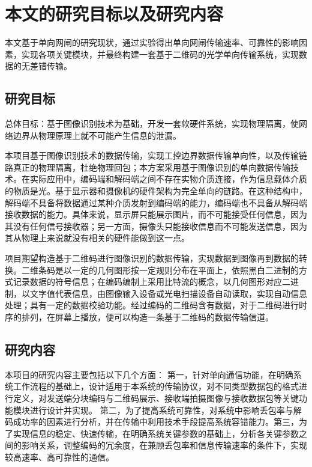 \section{本文的研究目标以及研究内容}

本文基于单向网闸的研究现状，通过实验得出单向网闸传输速率、可靠性的影响因素，实现各项关键模块，并最终构建一套基于二维码的光学单向传输系统，实现数据的无差错传输。

\subsection{研究目标}

总体目标：基于图像识别技术为基础，开发一套软硬件系统，实现物理隔离，使网络边界从物理原理上就不可能产生信息的泄漏。

本项目基于图像识别技术的数据传输，实现工控边界数据传输单向性，以及传输链路真正的物理隔离，杜绝物理回包；本方案采用基于图像识别的单向数据传输技术。在实际应用中，编码端和解码端之间不存在实物介质连接，作为信息载体介质的物质是光。基于显示器和摄像机的硬件架构为完全单向的链路。在这种结构中，解码端不具备将数据通过某种介质发射到编码端的能力，编码端也不具备从解码端接收数据的能力。具体来说，显示屏只能展示图片，而不可能接受任何信息，因为其没有任何信号接收器；另一方面，摄像头只能接收信息而不可能发送信息，因为其从物理上来说就没有相关的硬件能做到这一点。\cite{杨劲锋0基于连续视频图像捕获的二维条码解码技术研究与应用}

项目期望构造基于二维码进行图像识别的数据传输，实现数据到图像再到数据的转换。二维条码是以一定的几何图形按一定规则分布在平面上，依照黑白二进制的方式记录数据的符号信息；在编码编制上采用比特流的概念，以几何图形对应二进制，以文字值代表信息，由图像输入设备或光电扫描设备自动读取，实现自动信息处理；具有一定的数据校验功能。经过编码的二维码含有数据，对于二维码进行时序的排列，在屏幕上播放，便可以构造一条基于二维码的数据传输信道。\cite{钱军2010二维条形码在机关公文管理中的应用}

\subsection{研究内容}

本项目的研究内容主要包括以下几个方面： 第一，针对单向通信功能，在明确系统工作流程的基础上，设计适用于本系统的传输协议，对不同类型数据包的格式进行定义，对发送端分块编码与二维码展示、接收端拍摄图像与接收数据包等关键功能模块进行设计并实现。 第二，为了提高系统可靠性，对系统中影响丢包率与解码成功率的因素进行分析，并在传输中利用技术手段提高系统容错能力。第三，为了实现信息的稳定、快速传输，在明确系统关键参数的基础上，分析各关键参数之间的影响关系，调整编码的冗余度，在兼顾丢包率和信息传输速率的条件下，实现较高速率、高可靠性的通信。




